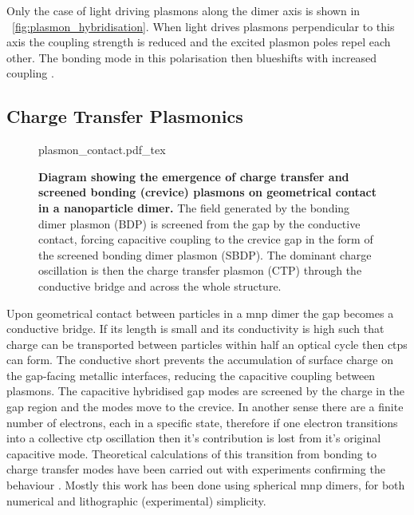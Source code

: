 \documentclass{article}
\begin{document}
Only the case of light driving plasmons along the dimer axis is shown in \figurename~\ref{fig:plasmon_hybridisation}. When light drives plasmons perpendicular to this axis the coupling strength is reduced and the excited plasmon poles repel each other. The bonding mode in this polarisation then blueshifts with increased coupling \cite{gunnarsson2005}.


\subsection{Charge Transfer Plasmonics}

\begin{figure}[bt]
\centering
\fontsize{10pt}{1em}\selectfont
\def\svgwidth{0.65\textwidth}
{plasmon_contact.pdf_tex}
\caption[Diagram showing the emergence of charge transfer and screened bonding (crevice) plasmons on geometrical contact in a nanoparticle dimer]{\textbf{Diagram showing the emergence of charge transfer and screened bonding (crevice) plasmons on geometrical contact in a nanoparticle dimer.} The field generated by the bonding dimer plasmon (BDP) is screened from the gap by the conductive contact, forcing capacitive coupling to the crevice gap in the form of the screened bonding dimer plasmon (SBDP). The dominant charge oscillation is then the charge transfer plasmon (CTP) through the conductive bridge and across the whole structure.}
\label{fig:plasmon_contact}
\end{figure}

Upon geometrical contact between particles in a \gls{mnp} dimer the gap becomes a conductive bridge. If its length is small and its conductivity is high such that charge can be transported between particles within half an optical cycle then \glspl{ctp} can form. The conductive short prevents the accumulation of surface charge on the gap-facing metallic interfaces, reducing the capacitive coupling between plasmons. The capacitive hybridised gap modes are screened by the charge in the gap region and the modes move to the crevice. In another sense there are a finite number of electrons, each in a specific state, therefore if one electron transitions into a collective \gls{ctp} oscillation then it's contribution is lost from it's original capacitive mode.
%
%
Theoretical calculations of this transition from bonding to charge transfer modes have been carried out \cite{romero2006, perez2010, tserkezis2014} with experiments confirming the behaviour \cite{lassiter2008, herrmann2014, benz2014}. Mostly this work has been done using spherical \gls{mnp} dimers, for both numerical and lithographic (experimental) simplicity.
\end{document}
